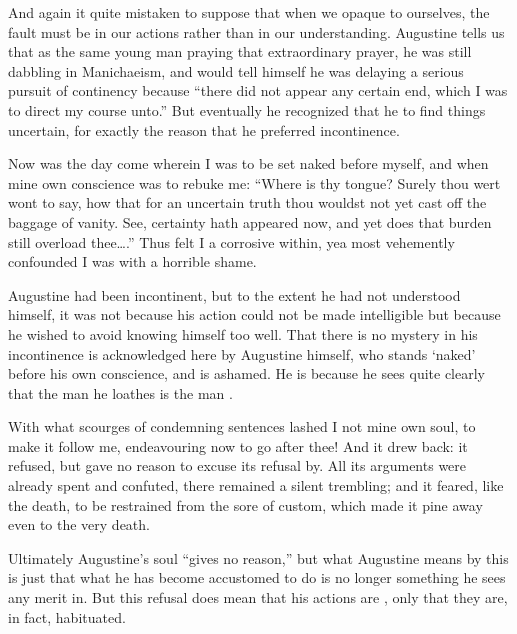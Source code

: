 \documentclass[11pt,letterpaper,oneside]{amsart}
\begin{document}


And again it quite mistaken to suppose that when we  opaque to ourselves, the fault must be in our actions rather than in our understanding. Augustine tells us that as the same young man praying that extraordinary prayer, he was still dabbling in Manichaeism, and would tell himself he was delaying a serious pursuit of continency because ``there did not appear any certain end, which I was to direct my course unto.'' But eventually he recognized that he  to find things uncertain, for exactly the reason that he preferred incontinence.\begin{squote}Now was the day come wherein I was to be set naked before myself, and when mine own conscience was to rebuke me: ``Where is thy tongue? Surely thou wert wont to say, how that for an uncertain truth thou wouldst not yet cast off the baggage of vanity. See, certainty hath appeared now, and yet does that burden still overload thee\ldots .'' Thus felt I a corrosive within, yea most vehemently confounded I was with a horrible shame.\end{squote} Augustine had been incontinent, but to the extent he had not understood himself, it was not because his action could not be made intelligible but because he wished to avoid knowing himself too well. That there is no mystery in his incontinence is acknowledged here by Augustine himself, who stands `naked' before his own conscience, and is ashamed. He is  because he sees quite clearly that the man he loathes is the man .\begin{squote}With what scourges of condemning sentences lashed I not mine own soul, to make it follow me, endeavouring now to go after thee! And it drew back: it refused, but gave no reason to excuse its refusal by. All its arguments were already spent and confuted, there remained a silent trembling; and it feared, like the death, to be restrained from the sore of custom, which made it pine away even to the very death.\end{squote} Ultimately Augustine's soul ``gives no reason,'' but what Augustine means by this is just that what he has become accustomed to do is no longer something he sees any merit in. But this refusal does  mean that his actions are , only that they are, in fact, habituated.


\end{document}
